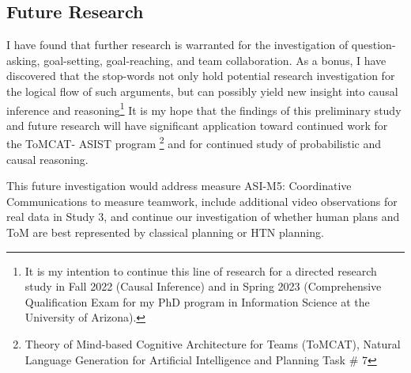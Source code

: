 \subsection{Future Research}
I have found that further research is warranted for the investigation of question-asking, goal-setting, goal-reaching, and team collaboration. As a bonus, I have discovered that the stop-words not only hold potential research investigation for the logical flow of such arguments, but can possibly yield new insight into causal inference and reasoning\footnote{It is my intention to continue this line of research for a directed research study in Fall 2022 (Causal Inference) and in Spring 2023 (Comprehensive Qualification Exam for my PhD program in Information Science at the University of Arizona).} It is my hope that the findings of this preliminary study and future research will have significant application toward continued work for the ToMCAT- ASIST program \footnote{Theory of Mind-based Cognitive Architecture for Teams (ToMCAT), Natural Language Generation for Artificial Intelligence and Planning Task \# 7} and for continued study of probabilistic and causal reasoning. 

This future investigation would
address measure ASI-M5: Coordinative Communications to
measure teamwork, include additional video observations for real data in Study
3, and continue our investigation of whether human plans and ToM are best
represented by classical planning or HTN planning.

\newpage





